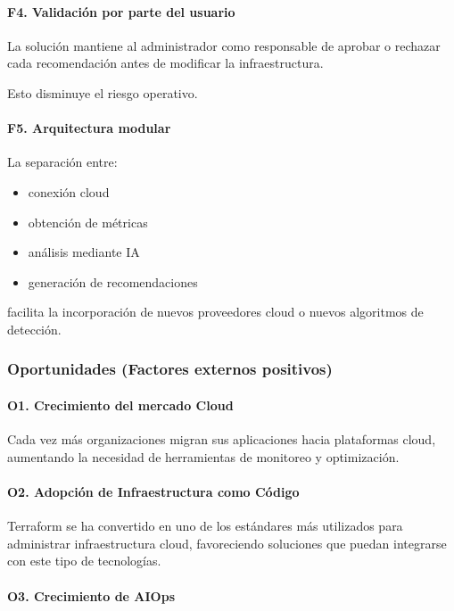 \paragraph*{F4. Validación por parte del usuario}

La solución mantiene al administrador como responsable de aprobar o rechazar cada recomendación antes de modificar la infraestructura.

Esto disminuye el riesgo operativo.

\paragraph*{F5. Arquitectura modular}

La separación entre:
\begin{itemize}
\item conexión cloud
\item obtención de métricas
\item análisis mediante IA
\item generación de recomendaciones
\end{itemize}

facilita la incorporación de nuevos proveedores cloud o nuevos algoritmos de detección.

\subsubsection{Oportunidades (Factores externos positivos)}

\paragraph*{O1. Crecimiento del mercado Cloud}

Cada vez más organizaciones migran sus aplicaciones hacia plataformas cloud, aumentando la necesidad de herramientas de monitoreo y optimización.

\paragraph*{O2. Adopción de Infraestructura como Código}

Terraform se ha convertido en uno de los estándares más utilizados para administrar infraestructura cloud, favoreciendo soluciones que puedan integrarse con este tipo de tecnologías.

\paragraph*{O3. Crecimiento de AIOps}

